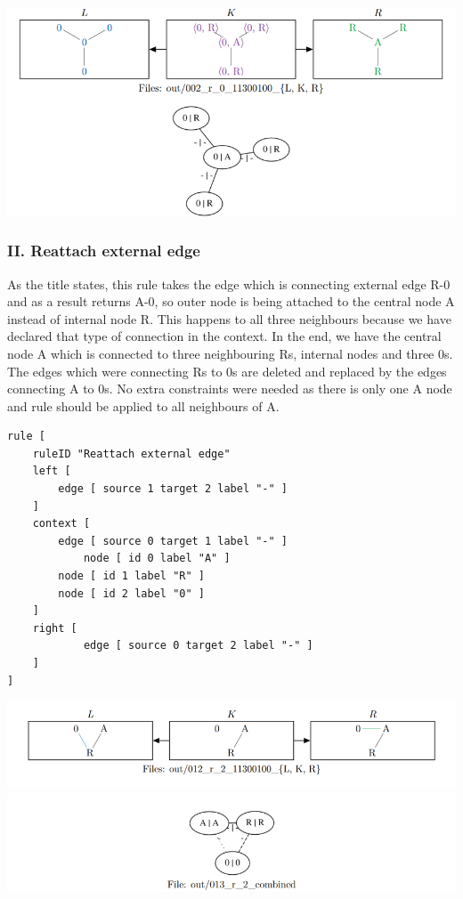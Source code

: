 \documentclass[a4paper,10pt,titlepage]{report}
\begin{document}
\vspace{10mm}
\includegraphics[scale=0.7]{i}
\vspace{10mm}

\subsubsection{II. Reattach external edge}

As the title states, this rule takes the edge which is connecting external edge  R-0 and as a result returns A-0, so outer node is being attached to the central node A instead of internal node R. This happens to all three neighbours because we have declared that type of connection in the context. In the end, we have the central node A which is connected to three neighbouring Rs, internal nodes and three 0s. The edges which were connecting Rs to 0s are deleted and replaced by the edges connecting A to 0s. No extra constraints were needed as there is only one A node and rule should be applied to all neighbours of A. 

\begin{lstlisting}
rule [
	ruleID "Reattach external edge"
	left [
		edge [ source 1 target 2 label "-" ]
	]
	context [
		edge [ source 0 target 1 label "-" ]
	        node [ id 0 label "A" ]
		node [ id 1 label "R" ]
		node [ id 2 label "0" ]
	]
	right [
	        edge [ source 0 target 2 label "-" ]
	]
]
\end{lstlisting}

\vspace{10mm}
\includegraphics[scale=0.7]{ii_1.png}
\includegraphics[scale=0.7]{ii_2.png}
\vspace{10mm}
\end{document}
